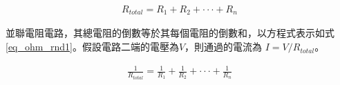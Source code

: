 \begin{equation}\label{eq_ohm_rn}
    \begin{split}
        R_{total} = R_{1} + R_{2} + \cdot\cdot\cdot + R_{n}
    \end{split}
\end{equation}

並聯電阻電路，其總電阻的倒數等於其每個電阻的倒數和，以方程式表示如式\ref{eq_ohm_rnd1}。假設電路二端的電壓為$V$，則通過的電流為 $I = V / R_{total}$。

\begin{equation}\label{eq_ohm_rnd1}
    \begin{split}
        \frac{1}{R_{total}} = \frac{1}{R_{1}} + \frac{1}{R_{2}} + \cdot\cdot\cdot + \frac{1}{R_{n}}
    \end{split}
\end{equation}

